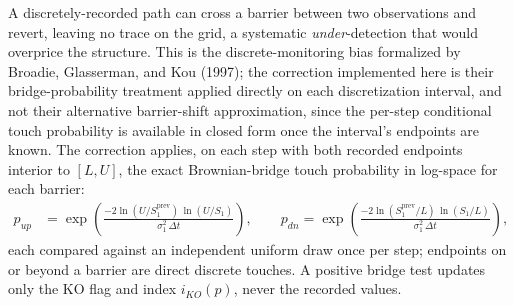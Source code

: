 \documentclass[11pt,a4paper]{article}
\begin{document}
A discretely-recorded path can cross a barrier between two observations and revert, leaving no trace on the grid, a systematic \emph{under}-detection that would overprice the structure. This is the discrete-monitoring bias formalized by Broadie, Glasserman, and Kou (1997); the correction implemented here is their bridge-probability treatment applied directly on each discretization interval, and not their alternative barrier-shift approximation, since the per-step conditional touch probability is available in closed form once the interval's endpoints are known. The correction applies, on each step with both recorded endpoints interior to $[L,U]$, the exact Brownian-bridge touch probability in log-space for each barrier:
\begin{align}
p_{up} &= \exp\!\left(\frac{-2\ln(U/S_1^{\text{prev}})\,\ln(U/S_1)}{\sigma_1^2\,\Delta t}\right), \qquad
p_{dn} = \exp\!\left(\frac{-2\ln(S_1^{\text{prev}}/L)\,\ln(S_1/L)}{\sigma_1^2\,\Delta t}\right),
\end{align}
each compared against an independent uniform draw once per step; endpoints on or beyond a barrier are direct discrete touches. A positive bridge test updates only the KO flag and index $i_{KO}(p)$, never the recorded values.
\end{document}
